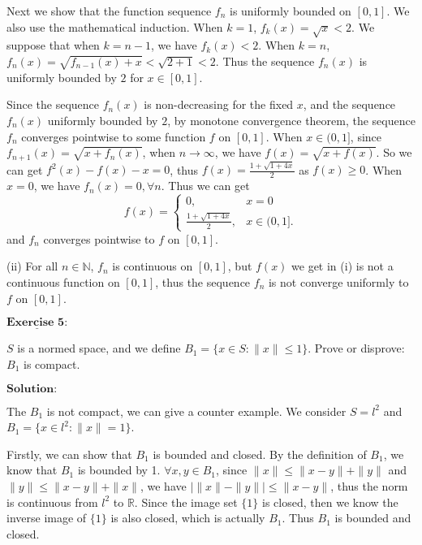 \documentclass[12pt,a4paper]{ctexart}
\begin{document}
Next we show that the function sequence $f_{n}$ is uniformly bounded on $[0,1]$. We also use the mathematical induction. When $k =1$, $f_{k}(x) = \sqrt{x} < 2$. We suppose that when $k = n-1$, we have $f_{k}(x) < 2$. When $k =n$, $f_{n}(x) = \sqrt{f_{n-1}(x) + x} < \sqrt{2+1} < 2$. Thus the sequence $f_n(x)$ is uniformly bounded by $2$ for $x \in [0,1] $.

Since the sequence $f_{n}(x)$ is non-decreasing for the fixed $x$, and the sequence $f_{n}(x)$ uniformly bounded by $2$, by monotone convergence theorem, the sequence $f_n$ converges pointwise to some function $f$ on $[0, 1]$. When $x \in (0,1]$, since $f_{n+1}(x) = \sqrt{x + f_{n}(x)}$, when $n \to \infty$, we have $f(x) = \sqrt{x + f(x)}$. So we can get $f^{2}(x) - f(x) - x = 0$, thus $f(x) = \frac{1 + \sqrt{1 + 4 x}}{2}$ as $f(x) \geq 0$. When $x =  0$, we have $f_{n} (x) = 0, \forall n$. Thus we can get
\begin{equation*}
f(x) =
\left\{
             \begin{array}{cl}
             0, & x = 0 \\
             \frac{1 + \sqrt{1 + 4 x}}{2}, & x \in (0, 1].
             \end{array}
\right.
\end{equation*}
and $f_n$ converges pointwise to $f$ on $[0,1]$.

(ii) For all $n \in \mathbb{N}$, $ f_{n}$ is continuous on $[0,1]$, but $f(x)$ we get in (i) is not a continuous function on $[0,1]$, thus the sequence $f_{n}$ is not converge uniformly to $f$ on $[0, 1]$.

\newpage

$\underline{\textbf{Exercise 5:}}$

$S$ is a normed space, and we define $B_{1} = \{ x \in S: \|x\| \leq 1 \}$. Prove or disprove: $B_{1}$ is compact.

\vspace{8pt}
$\textbf{Solution:}$

The $B_{1}$ is not compact, we can give a counter example. We consider $S = l^{2}$ and $B_{1} = \{ x \in l^{2}: \|x\| = 1 \}$. 

Firstly, we can show that $B_{1}$ is bounded and closed. By the definition of $B_{1}$, we know that $B_{1}$ is bounded by 1. $\forall x, y \in B_{1}$, since $\|x\| \leq \|x - y \| + \|y\|$ and $\|y\| \leq \|x - y \| + \|x\|$, we have $| \|x\| - \|y\| | \leq \|x - y\|$, thus the norm is continuous from $l^{2}$ to $\mathbb{R}$. Since the image set $\{1\}$ is closed, then we know the inverse image of $\{1\}$ is also closed, which is actually $B_{1}$. Thus $B_{1}$ is bounded and closed.
\end{document}
